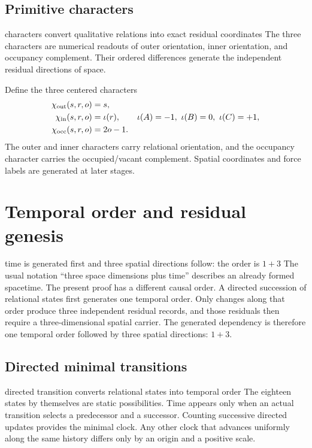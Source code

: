 \documentclass[11pt]{article}
\numberwithin{equation}{section}
\theoremstyle{remark}
\begin{document}
\subsection{Primitive characters}
\begin{interpretivebridge}{characters convert qualitative relations into exact residual coordinates}
The three characters are numerical readouts of outer orientation, inner orientation, and occupancy complement. Their ordered differences generate the independent residual directions of space.
\end{interpretivebridge}

Define the three centered characters
\begin{align}
\chi_{\rm out}(s,r,o)&=s,\\
\chi_{\rm in}(s,r,o)&=\iota(r),\qquad \iota(A)=-1,\ \iota(B)=0,\ \iota(C)=+1,\\
\chi_{\rm occ}(s,r,o)&=2o-1.
\end{align}
The outer and inner characters carry relational orientation, and the occupancy character carries the occupied/vacant complement. Spatial coordinates and force labels are generated at later stages.

\section{Temporal order and residual genesis}
\begin{conceptledger}{time is generated first and three spatial directions follow: the order is $1+3$}
The usual notation ``three space dimensions plus time'' describes an already formed spacetime. The present proof has a different causal order. A directed succession of relational states first generates one temporal order. Only changes along that order produce three independent residual records, and those residuals then require a three-dimensional spatial carrier. The generated dependency is therefore one temporal order followed by three spatial directions: $1+3$.
\end{conceptledger}

\label{sec:time}

\subsection{Directed minimal transitions}
\begin{interpretivebridge}{directed transition converts relational states into temporal order}
The eighteen states by themselves are static possibilities. Time appears only when an actual transition selects a predecessor and a successor. Counting successive directed updates provides the minimal clock. Any other clock that advances uniformly along the same history differs only by an origin and a positive scale.
\end{interpretivebridge}
\end{document}
